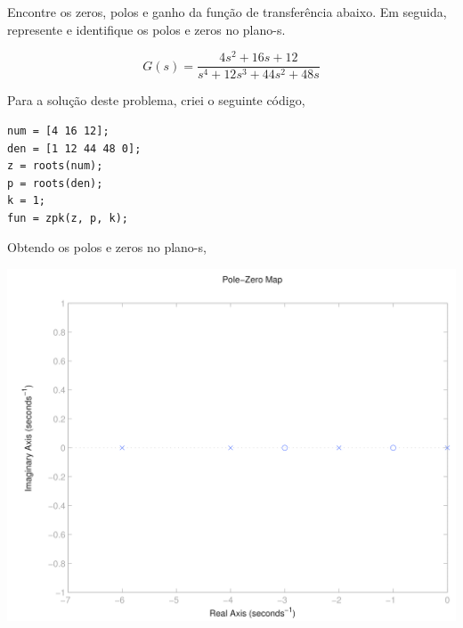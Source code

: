 \documentclass[a4paper, 10pt]{article}
\begin{document}
\begin{list}{\textbf{Questão .}}{
\setlength{\labelwidth}{-2mm} \setlength{\parsep}{0mm}
\setlength{\topsep}{0mm} \setlength{\leftmargin}{0mm}}
\begin{enumerate}
    \end{enumerate}
    



\newpage

\item
    Encontre os zeros, polos e ganho da função de transferência abaixo. Em seguida, 
    represente e identifique os polos e zeros no plano-s.

    $$
    G(s) = \frac{4 s^2 + 16 s + 12}{s^4 + 12 s^3 +  44 s^2 + 48 s}
    $$


    Para a solução deste problema, criei o seguinte código,

 
     \begin{lstlisting}
num = [4 16 12];
den = [1 12 44 48 0];
z = roots(num);
p = roots(den);
k = 1;
fun = zpk(z, p, k);
     \end{lstlisting}

     Obtendo os polos e zeros no plano-s,
        \begin{center}
                \includegraphics[scale=0.15]{fig3q.png}
             \end{center}
    




\end{list}
\end{document}
